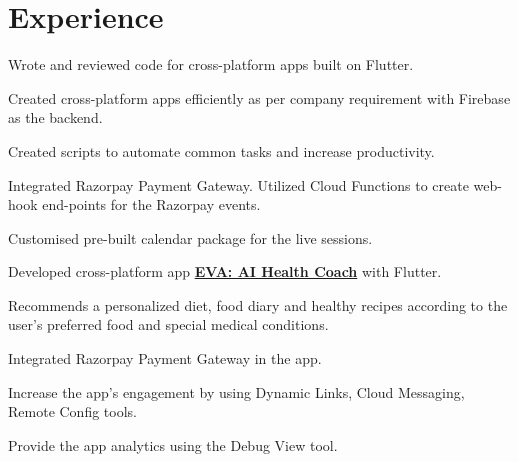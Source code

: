 \documentclass[]{deedy-resume-reversed}
\begin{document}
%
%

%
%

%
%

\begin{minipage}[t]{0.60\textwidth}


\section{Experience}
\vspace{\topsep} %
\begin{tightemize}
\item Wrote and reviewed code for cross-platform apps built on Flutter.
\item Created cross-platform apps efficiently as per company requirement with Firebase as the backend.
\item Created scripts to automate common tasks and increase productivity.
\item Integrated Razorpay Payment Gateway. Utilized Cloud Functions to create web-hook end-points for the Razorpay events.
\item Customised pre-built calendar package for the live sessions.
\end{tightemize}
\sectionsep

\begin{tightemize}
\item Developed cross-platform app \textbf{\href{https://www.thehealthycompany.in/eva/}{EVA: AI Health Coach}} with Flutter. 
\item Recommends a personalized diet, food diary and healthy recipes according to the user's preferred food and special medical conditions.
\item Integrated Razorpay Payment Gateway in the app.
\item Increase the app's engagement by using Dynamic Links, Cloud Messaging, Remote Config tools. 
\item Provide the app analytics using the Debug View tool.
\end{tightemize}
\sectionsep


\end{minipage}
\end{document}
